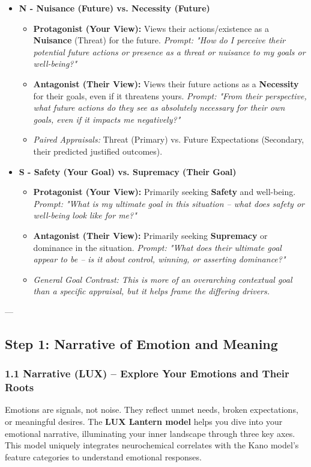 \documentclass{article}
\begin{document}
\begin{itemize}[noitemsep,topsep=0pt]
    \item \textbf{N - Nuisance (Future) vs. Necessity (Future)}
    \begin{itemize}[noitemsep,topsep=0pt]
        \item \textbf{Protagonist (Your View):} Views their actions/existence as a \textbf{Nuisance} (Threat) for the future. \textit{Prompt: "How do I perceive their potential future actions or presence as a threat or nuisance to my goals or well-being?"}
        \item \textbf{Antagonist (Their View):} Views their future actions as a \textbf{Necessity} for their goals, even if it threatens yours. \textit{Prompt: "From their perspective, what future actions do they see as absolutely necessary for their own goals, even if it impacts me negatively?"}
        \item \textit{Paired Appraisals:} Threat (Primary) vs. Future Expectations (Secondary, their predicted justified outcomes).
    \end{itemize}

    \item \textbf{S - Safety (Your Goal) vs. Supremacy (Their Goal)}
    \begin{itemize}[noitemsep,topsep=0pt]
        \item \textbf{Protagonist (Your View):} Primarily seeking \textbf{Safety} and well-being. \textit{Prompt: "What is my ultimate goal in this situation – what does safety or well-being look like for me?"}
        \item \textbf{Antagonist (Their View):} Primarily seeking \textbf{Supremacy} or dominance in the situation. \textit{Prompt: "What does their ultimate goal appear to be – is it about control, winning, or asserting dominance?"}
        \item \textit{General Goal Contrast: This is more of an overarching contextual goal than a specific appraisal, but it helps frame the differing drivers.}
    \end{itemize}
\end{itemize}

---

\subsection{Step 1: Narrative of Emotion and Meaning}

\subsubsection{1.1 Narrative (LUX) – Explore Your Emotions and Their Roots}
Emotions are signals, not noise. They reflect unmet needs, broken expectations, or meaningful desires. The \textbf{LUX Lantern model} helps you dive into your emotional narrative, illuminating your inner landscape through three key axes. This model uniquely integrates neurochemical correlates with the Kano model's feature categories to understand emotional responses.
\end{document}
